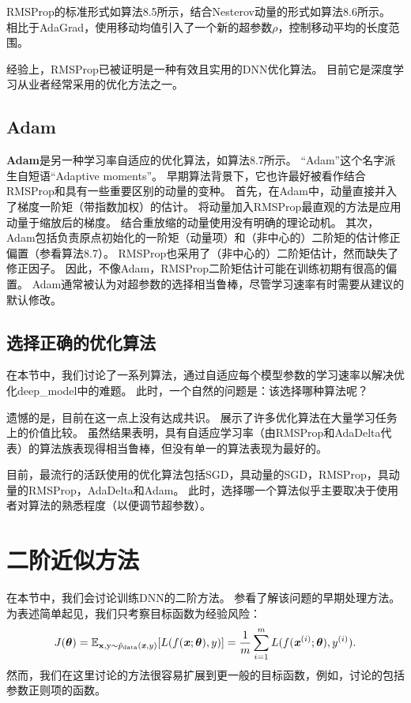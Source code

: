 
RMSProp的标准形式如算法8.5所示，结合Nesterov动量的形式如算法8.6所示。
相比于AdaGrad，使用移动均值引入了一个新的超参数$\rho$，控制移动平均的长度范围。


经验上，RMSProp已被证明是一种有效且实用的\gls{DNN}优化算法。
目前它是深度学习从业者经常采用的优化方法之一。

\subsection{Adam}
\label{sec:adam}
\textbf{Adam}\citep{kingma2014adam}是另一种学习率自适应的优化算法，如算法8.7所示。
``Adam''这个名字派生自短语``Adaptive moments''。
早期算法背景下，它也许最好被看作结合RMSProp和具有一些重要区别的动量的变种。
首先，在Adam中，动量直接并入了梯度一阶矩（带指数加权）的估计。
将动量加入RMSProp最直观的方法是应用动量于缩放后的梯度。
结合重放缩的动量使用没有明确的理论动机。
其次，Adam包括负责原点初始化的一阶矩（动量项）和（非中心的）二阶矩的估计修正偏置（参看算法8.7）。
RMSProp也采用了（非中心的）二阶矩估计，然而缺失了修正因子。
因此，不像Adam，RMSProp二阶矩估计可能在训练初期有很高的偏置。
Adam通常被认为对超参数的选择相当鲁棒，尽管学习速率有时需要从建议的默认修改。


\subsection{选择正确的优化算法}
\label{sec:choosing_the_right_optimization_algorithms}
在本节中，我们讨论了一系列算法，通过自适应每个模型参数的学习速率以解决优化\gls{deep_model}中的难题。
此时，一个自然的问题是：该选择哪种算法呢？

遗憾的是，目前在这一点上没有达成共识。
\cite{Schaul2014_unittests}展示了许多优化算法在大量学习任务上的价值比较。
虽然结果表明，具有自适应学习率（由RMSProp和AdaDelta代表）的算法族表现得相当鲁棒，但没有单一的算法表现为最好的。

目前，最流行的活跃使用的优化算法包括SGD，具动量的SGD，RMSProp，具动量的RMSProp，AdaDelta和Adam。
此时，选择哪一个算法似乎主要取决于使用者对算法的熟悉程度（以便调节超参数）。

\section{二阶近似方法}
\label{sec:approximate_second_order_methods}
在本节中，我们会讨论训练\gls{DNN}的二阶方法。
参看\cite{lecun1998mnist}了解该问题的早期处理方法。
为表述简单起见，我们只考察目标函数为经验风险：
\begin{equation}
    J(\boldsymbol{\theta}) = \mathbb{E}_{\mathbf{x}, \mathrm{y} \sim \hat{p}_{\text{data}}(\boldsymbol{\mathit{x}},y) } [ L(f(\boldsymbol{\mathit{x}}; \boldsymbol{\theta}), y) ] =
\frac{1}{m} \sum_{i=1}^m L(f(\boldsymbol{\mathit{x}}^{(i)}; \boldsymbol{\theta}), y^{(i)}).
\end{equation}
然而，我们在这里讨论的方法很容易扩展到更一般的目标函数，例如，讨论的包括参数正则项的函数。

